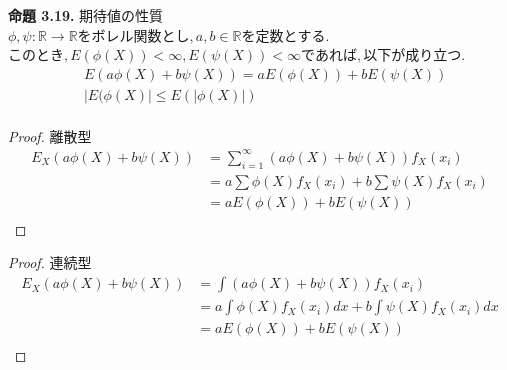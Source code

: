 \documentclass[dvipdfmx,10pt, a4j]{jarticle}
\theoremstyle{definition}
\begin{document}
\noindent
\textbf{命題 3.19.} 期待値の性質\\
$\phi, \psi: \mathbb{R} \to \mathbb{R} をボレル関数とし, a, b \in \mathbb{R} を定数とする.$
$このとき, E(\phi(X)) < \infty, E(\psi(X)) < \infty であれば, 以下が成り立つ.$\\
\begin{align*}
     & E(a\phi(X) + b\psi(X)) = aE(\phi(X)) + bE(\psi(X)) \\
     & |E(\phi(X)| \leq E(|\phi(X)|)                      \\
\end{align*}
\begin{proof}離散型\\
    \begin{align*}
        E_X(a \phi(X) + b\psi(X)) & = \sum_{i=1}^{\infty}{(a \phi(X) + b\psi(X))}f_X(x_i) \\
                                  & = a \sum \phi(X)f_X(x_i) + b \sum \psi(X)f_X(x_i)     \\
                                  & = aE(\phi(X)) + bE(\psi(X))                           \\
    \end{align*}
\end{proof}
\begin{proof}連続型\\
    \begin{align*}
        E_X(a \phi(X) + b\psi(X)) & = \int{(a \phi(X) + b\psi(X))}f_X(x_i)                \\
                                  & = a \int \phi(X)f_X(x_i)dx + b \int \psi(X)f_X(x_i)dx \\
                                  & = aE(\phi(X)) + bE(\psi(X))                           \\
    \end{align*}
\end{proof}
\end{document}
